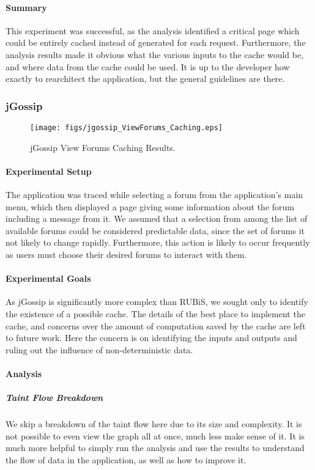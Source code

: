 \documentclass[msc,oneside]{ubcthesis}
\begin{document}
\paragraph{Summary}
This experiment was successful, as the analysis identified a critical page which could be entirely cached instead of generated for each request. Furthermore, the analysis results made it obvious what the various inputs to the cache would be, and where data from the cache could be used. It is up to the developer how exactly to rearchitect the application, but the general guidelines are there.

\subsubsection{jGossip} 
\label{sec:jcaching}

\begin{sidewaysfigure}
\centering
\scalebox{0.44}
{\texttt{[image: figs/jgossip\_ViewForums\_Caching.eps]}}
\caption{jGossip View Forums Caching Results.} 
\label{fig:viewforumscaching}
\end{sidewaysfigure}

\paragraph{Experimental Setup}
\label{jgossip:caching}
The application was traced while selecting a forum from the application's main menu, which then displayed a page giving some information about the forum including a message from it. We assumed that a selection from among the list of available forums could be considered predictable data, since the set of forums it not likely to change rapidly. Furthermore, this action is likely to occur frequently as users must choose their desired forums to interact with them.

\paragraph{Experimental Goals}
As jGossip is significantly more complex than RUBiS, we sought only to identify the existence of a possible cache. The details of the best place to implement the cache, and concerns over the amount of computation saved by the cache are left to future work. Here the concern is on identifying the inputs and outputs and ruling out the influence of non-deterministic data.

\paragraph{Analysis}
\subparagraph{Taint Flow Breakdown}
We skip a breakdown of the taint flow here due to its size and complexity. It is not possible to even view the graph all at once, much less make sense of it. It is much more helpful to simply run the analysis and use the results to understand the flow of data in the application, as well as how to improve it.
\end{document}
